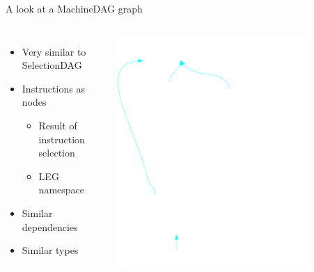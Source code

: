 
\begin{frame}{A look at a MachineDAG graph}

\begin{columns}[t]
    \begin{itemize}
        \item Very similar to SelectionDAG
        \item Instructions as nodes
        \begin{itemize}
            \item Result of instruction selection
            \item LEG namespace
        \end{itemize}
        \item Similar dependencies
        \item Similar types
    \end{itemize}
    \begin{block}{}
        \includegraphics[width = 0.8\textwidth]{examples/ex1-entry-machine-dag.png}
    \end{block}
\end{columns}

\end{frame}

